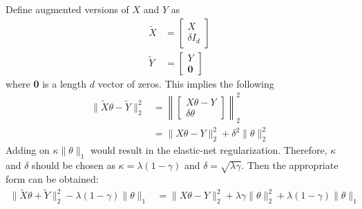 \begin{Parts}
\begin{solution}
Define augmented versions of $X$ and $Y$ as \begin{align*}
\tilde X & = \begin{bmatrix}
X \\
\delta I_d
\end{bmatrix} \\
\tilde Y & = \begin{bmatrix}
Y \\
\textbf{0}
\end{bmatrix}
\end{align*}
where \textbf{0} is a length $d$ vector of zeros. This implies the following
\begin{align*}
\|\tilde X\theta - \tilde Y\|_2^2 & = \left\| \begin{bmatrix} X\theta - Y \\ \delta \theta \end{bmatrix}\right\|_2^2 \\
& = \| X\theta - Y \|_2^2 + \delta^2\| \theta\|^2_2
\end{align*}
Adding on $\kappa \|\theta\|_1$ would result in the elastic-net regularization. Therefore, $\kappa$ and $\delta$ should be chosen as $\kappa = \lambda(1 - \gamma)$ and $\delta = \sqrt{\lambda \gamma}$. Then the appropriate form can be obtained:
\begin{align*}
\|\tilde X \theta + \tilde Y\|^2_2 - \lambda(1 - \gamma) \| \theta\|_1 & = \| X\theta - Y \|_2^2 + \lambda \gamma \| \theta\|^2_2 + \lambda (1 - \gamma) \|\theta\|_1
\end{align*}
\end{solution}
\end{Parts}

\newpage